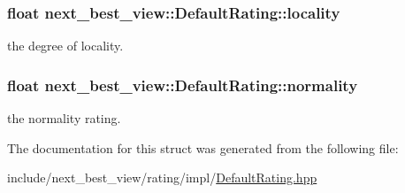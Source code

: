 \hypertarget{structnext__best__view_1_1DefaultRating_a5527534f5ed7009fd7b399ef2e3c594e}{
\subsubsection[{locality}]{\setlength{\rightskip}{0pt plus 5cm}float {\bf next\-\_\-best\-\_\-view\-::\-Default\-Rating\-::locality}}}\label{structnext__best__view_1_1DefaultRating_a5527534f5ed7009fd7b399ef2e3c594e}


the degree of locality. 

\hypertarget{structnext__best__view_1_1DefaultRating_a4e90c062499c1516f3a89ac83b0e8e42}{
\subsubsection[{normality}]{\setlength{\rightskip}{0pt plus 5cm}float {\bf next\-\_\-best\-\_\-view\-::\-Default\-Rating\-::normality}}}\label{structnext__best__view_1_1DefaultRating_a4e90c062499c1516f3a89ac83b0e8e42}


the normality rating. 



\-The documentation for this struct was generated from the following file\-:\begin{DoxyCompactItemize}
\item 
include/next\-\_\-best\-\_\-view/rating/impl/\hyperlink{DefaultRating_8hpp}{\-Default\-Rating.\-hpp}\end{DoxyCompactItemize}
